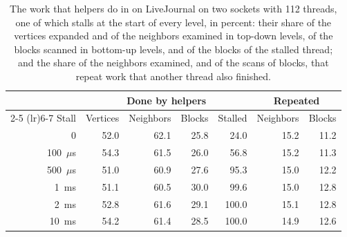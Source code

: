 \begin{table}
    \caption{The work that helpers do in \wfdo on LiveJournal on two sockets with 112 threads, one of which stalls at the start of every level, in percent: their share of the vertices expanded and of the neighbors examined in top-down levels, of the blocks scanned in bottom-up levels, and of the blocks of the stalled thread; and the share of the neighbors examined, and of the scans of blocks, that repeat work that another thread also finished.}
    \label{tab:helping}
    \small
    \setlength{\tabcolsep}{4pt}
    \begin{tabular}{r r r r r r r}
        \toprule
        & \multicolumn{4}{c}{Done by helpers} & \multicolumn{2}{c}{Repeated} \\
        \cmidrule(lr){2-5} \cmidrule(lr){6-7}
        Stall & Vertices & Neighbors & Blocks & Stalled & Neighbors & Blocks \\
        \midrule
        0 & 52.0 & 62.1 & 25.8 & 24.0 & 15.2 & 11.2 \\
        100~$\mu$s & 54.3 & 61.5 & 26.0 & 56.8 & 15.2 & 11.3 \\
        500~$\mu$s & 51.0 & 60.9 & 27.6 & 95.3 & 15.0 & 12.2 \\
        1~ms & 51.1 & 60.5 & 30.0 & 99.6 & 15.0 & 12.8 \\
        2~ms & 52.8 & 61.6 & 29.1 & 100.0 & 15.1 & 12.8 \\
        10~ms & 54.2 & 61.4 & 28.5 & 100.0 & 14.9 & 12.6 \\
        \bottomrule
    \end{tabular}
\end{table}

